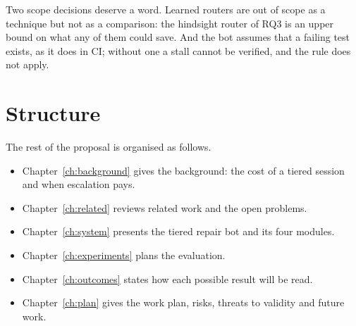 Two scope decisions deserve a word. Learned routers are out of scope as a
technique but not as a comparison: the hindsight router of RQ3 is an upper
bound on what any of them could save. And the bot assumes that a failing test
exists, as it does in CI; without one a stall cannot be verified, and the rule
does not apply.

\section{Structure}

The rest of the proposal is organised as follows.
\begin{itemize}
\item Chapter~\ref{ch:background} gives the background: the cost of a tiered
session and when escalation pays.
\item Chapter~\ref{ch:related} reviews related work and the open problems.
\item Chapter~\ref{ch:system} presents the tiered repair bot and its four
modules.
\item Chapter~\ref{ch:experiments} plans the evaluation.
\item Chapter~\ref{ch:outcomes} states how each possible result will be read.
\item Chapter~\ref{ch:plan} gives the work plan, risks, threats to validity
and future work.
\end{itemize}
